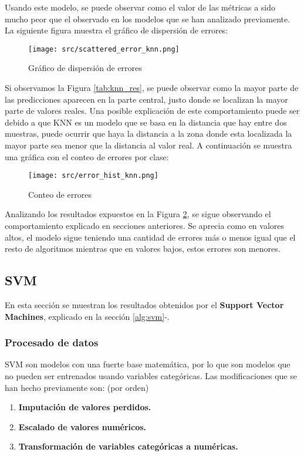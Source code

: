 Usando este modelo, se puede observar como el valor de las métricas a sido mucho peor que el observado en los modelos que se han analizado previamente.
\clearpage
La siguiente figura muestra el gráfico de dispersión de errores:
\begin{figure}[H]
	\centering
	\texttt{[image: src/scattered\_error\_knn.png]}
	\caption{Gráfico de dispersión de errores}
	\label{fig:knn_scattered}
\end{figure}
Si observamos la Figura \ref{tab:knn_res}, se puede observar como la mayor parte de las predicciones aparecen en la parte central, justo donde se localizan la mayor parte de valores reales. Una posible explicación de este comportamiento puede ser debido a que KNN es un modelo que se basa en la distancia que hay entre dos muestras, puede ocurrir que haya la distancia a la zona donde esta localizada la mayor parte sea menor que la distancia al valor real.
\clearpage
A continuación se muestra una gráfica con el conteo de errores por clase:
\begin{figure}[H]
	\centering
	\texttt{[image: src/error\_hist\_knn.png]}
	\caption{Conteo de errores}
	\label{fig:knn_error_plot}
\end{figure}
Analizando los resultados expuestos en la Figura \ref{fig:knn_error_plot}, se sigue observando el comportamiento explicado en secciones anteriores. Se aprecia como en valores altos, el modelo sigue teniendo una cantidad de errores más o menos igual que el resto de algoritmos mientras que en valores bajos, estos errores son menores.
\clearpage
\subsection{SVM}
En esta sección se muestran los resultados obtenidos por el \textbf{Support Vector Machines}, explicado en la sección \ref{alg:svm}-.
\subsubsection*{Procesado de datos}
SVM son modelos con una fuerte base matemática, por lo que son modelos que no pueden ser entrenados usando variables categóricas.
Las modificaciones que se han hecho previamente son: (por orden)
\begin{enumerate}
	\item \textbf{Imputación de valores perdidos.}
	\item \textbf{Escalado de valores numéricos.}
	\item \textbf{Transformación de variables categóricas a numéricas.}
\end{enumerate}
